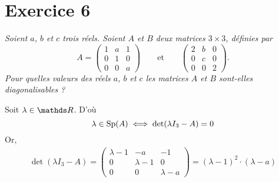 \section{Exercice 6}

{\slshape Soient $a$, $b$\/ et $c$\/ trois réels. Soient $A$\/ et $B$\/ deux matrices $3 \times 3$, définies par \[
	A = \begin{pmatrix}
		1&a&1\\
		0&1&0\\
		0&0&a
	\end{pmatrix}\qquad\text{et}\qquad\begin{pmatrix}
		2&b&0\\
		0&c&0\\
		0&0&2
	\end{pmatrix}
.\]
Pour quelles valeurs des réels $a$, $b$\/ et $c$\/ les matrices $A$\/ et $B$\/ sont-elles diagonalisables ?}

Soit $\lambda \in \R$. D'où
\[	\lambda \in \operatorname{Sp}(A) \iff \operatorname{det}(\lambda I_3 - A) = 0\]
Or,
\begin{align*}
	\det(\lambda I_3 - A) = \begin{pmatrix}
		\lambda - 1&-a&-1\\
		0&\lambda-1&0\\
		0&0&\lambda-a
	\end{pmatrix} = (\lambda-1)^2 \cdot (\lambda - a)
\end{align*}

